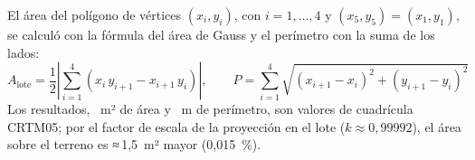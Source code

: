 \documentclass[10pt]{article}
\begin{document}
El área del polígono de vértices \((x_i, y_i)\), con \(i = 1,\dots,4\) y \((x_5, y_5) = (x_1, y_1)\), se calculó con
la fórmula del área de Gauss y el perímetro con la suma de los lados:
\begin{equation}
  A_{\text{lote}} = \frac{1}{2}\left|\sum_{i=1}^{4}\left(x_i\,y_{i+1} - x_{i+1}\,y_i\right)\right|, \qquad
  P = \sum_{i=1}^{4}\sqrt{(x_{i+1}-x_i)^2 + (y_{i+1}-y_i)^2}
  \label{eq:area}
\end{equation}
Los resultados, \AreaLote~m² de área y \Perimetro~m de perímetro, son valores de cuadrícula CRTM05; por el factor de
escala de la proyección en el lote (\(k \approx 0{,}99992\)), el área sobre el terreno es ≈\,1,5~m² mayor (0,015~\%).

\end{document}
